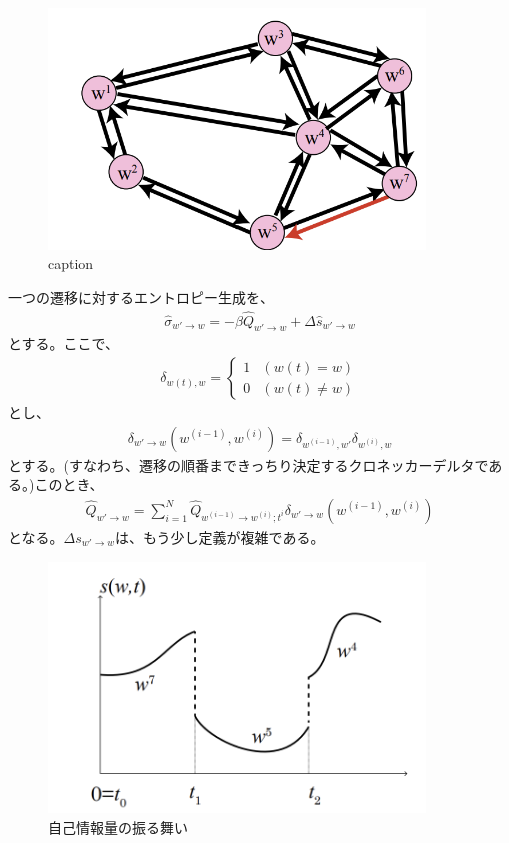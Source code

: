 \documentclass[a4paper,11pt]{jsarticle}
\numberwithin{equation}{section}
\begin{document}
\begin{figure}[H]
    \begin{center}
    \includegraphics[width=100mm]{partial1.png}
    \end{center}
    \caption{caption}
    \label{fig:状態空間の例と単一の遷移の選びかた}
\end{figure}

一つの遷移に対するエントロピー生成を、
\begin{align}
    \hat{\sigma}_{w' \to w} = -\beta \hat{Q}_{w' \to w} + \Delta \hat{s}_{w' \to w}
\end{align}
とする。ここで、
\begin{align}
    \delta_{w(t),w} 
    = \begin{cases}
        1 & (w(t) = w) \\
        0 & (w(t) \neq w)
    \end{cases}
\end{align}
とし、
\begin{align}
    \delta_{w' \to w}(w^{(i-1)}, w^{(i)}) = \delta_{w^{(i-1)}, w'} \delta_{w^{(i)}, w}
\end{align}
とする。(すなわち、遷移の順番まできっちり決定するクロネッカーデルタである。)このとき、
\begin{align}
    \hat{Q}_{w' \to w} = \sum_{i = 1}^{N} \hat{Q}_{w^{(i-1)} \to w^{(i)};t^i}\delta_{w'\to w}(w^{(i-1)}, w^{(i)})
\end{align}
となる。$\Delta s_{w' \to w}$は、もう少し定義が複雑である。\\

\begin{figure}[H]
    \begin{center}
    \includegraphics[width=100mm]{stoen.png}
    \end{center}
    \caption{自己情報量の振る舞い}
    \label{fig:one}
\end{figure}
\end{document}
